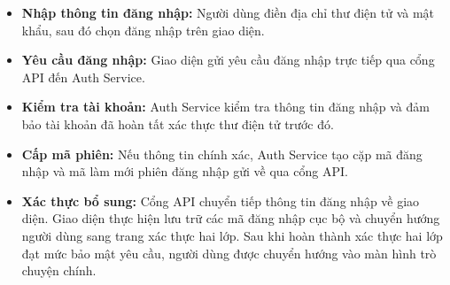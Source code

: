\begin{itemize}

\item \textbf{Nhập thông tin đăng nhập:}
Người dùng điền
địa chỉ thư điện tử và mật khẩu,
sau đó chọn đăng nhập trên giao diện.

\item \textbf{Yêu cầu đăng nhập:}
Giao diện gửi yêu cầu đăng nhập
trực tiếp qua cổng API đến Auth Service.

\item \textbf{Kiểm tra tài khoản:}
Auth Service kiểm tra thông tin đăng nhập
và đảm bảo tài khoản
đã hoàn tất xác thực thư điện tử trước đó.

\item \textbf{Cấp mã phiên:}
Nếu thông tin chính xác,
Auth Service tạo cặp mã đăng nhập
và mã làm mới phiên đăng nhập gửi về qua cổng API.

\item \textbf{Xác thực bổ sung:}
Cổng API chuyển tiếp thông tin đăng nhập về giao diện.
Giao diện thực hiện lưu trữ
các mã đăng nhập cục bộ
và chuyển hướng người dùng sang trang xác thực hai lớp.
Sau khi hoàn thành xác thực hai lớp đạt mức bảo mật yêu cầu,
người dùng được chuyển hướng vào màn hình trò chuyện chính.
\end{itemize}
